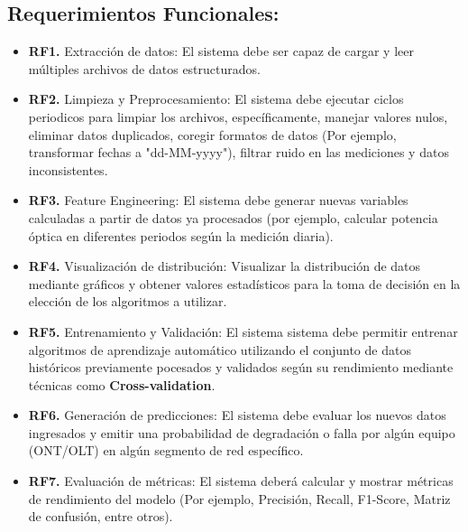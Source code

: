 \documentclass[12pt,a4paper]{article}
\begin{document}
        \subsection{\textbf{Requerimientos Funcionales:}}
                    \begin{itemize}
                        \item \textbf{RF1.} Extracción de datos: El sistema debe ser capaz de cargar y leer múltiples archivos de datos estructurados.
                        \item \textbf{RF2.} Limpieza y Preprocesamiento: El sistema debe ejecutar ciclos periodicos para limpiar los archivos, específicamente, manejar valores nulos, eliminar datos duplicados, coregir formatos de datos (Por ejemplo, transformar fechas a "dd-MM-yyyy"), filtrar ruido en las mediciones y datos inconsistentes.
                        \item \textbf{RF3.} Feature Engineering: El sistema debe generar nuevas variables calculadas a partir de datos ya procesados (por ejemplo, calcular potencia óptica en diferentes periodos según la medición diaria).
                        \item \textbf{RF4.} Visualización de distribución: Visualizar la distribución de datos mediante gráficos y obtener valores estadísticos para la toma de decisión en la elección de los algoritmos a utilizar.
                        \item \textbf{RF5.} Entrenamiento y Validación: El sistema sistema debe permitir entrenar algoritmos de aprendizaje automático utilizando el conjunto de datos históricos previamente pocesados y validados según su rendimiento mediante técnicas como \textbf{Cross-validation}.
                        \item \textbf{RF6.} Generación de predicciones: El sistema debe evaluar los nuevos datos ingresados y emitir una probabilidad de degradación o falla por algún equipo (ONT/OLT) en algún segmento de red específico.
                        \item \textbf{RF7.} Evaluación de métricas: El sistema deberá calcular y mostrar métricas de rendimiento del modelo (Por ejemplo, Precisión, Recall, F1-Score, Matriz de confusión, entre otros). 
                    \end{itemize}
\end{document}

